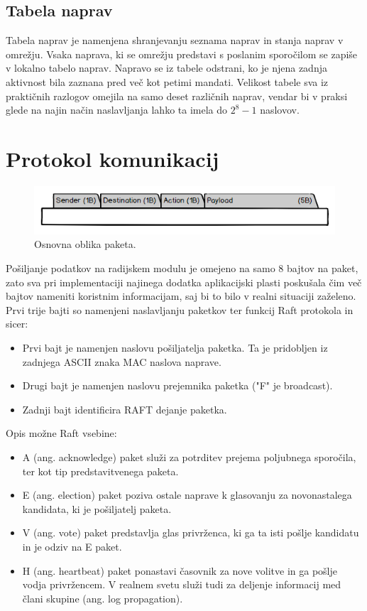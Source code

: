 \documentclass[runningheads]{llncs}
\begin{document}
\subsection{Tabela naprav}
Tabela naprav je namenjena shranjevanju seznama naprav in stanja naprav v omrežju. Vsaka naprava, ki se omrežju predstavi s poslanim sporočilom se zapiše v lokalno tabelo naprav. Napravo se iz tabele odstrani, ko je njena zadnja aktivnost bila zaznana pred več kot petimi mandati. Velikost tabele sva iz praktičnih razlogov omejila na samo deset različnih naprav, vendar bi v praksi glede na najin način naslavljanja lahko ta imela do $2^{8} - 1$ naslovov.

\section{Protokol komunikacij}
\begin{figure}
  \includegraphics[width=\linewidth]{packet.png}
  \caption{Osnovna oblika paketa.}
  \label{fig:paket}
\end{figure}
Pošiljanje podatkov na radijskem modulu je omejeno na samo 8 bajtov na paket, zato sva pri implementaciji najinega dodatka aplikacijski plasti poskušala čim več bajtov nameniti koristnim informacijam, saj bi to bilo v realni situaciji zaželeno. Prvi trije bajti so namenjeni naslavljanju paketkov ter funkcij Raft protokola in sicer: \\
\begin{itemize}
\item Prvi bajt je namenjen naslovu pošiljatelja paketka. Ta je pridobljen iz zadnjega ASCII znaka MAC naslova naprave.
\item Drugi bajt je namenjen naslovu prejemnika paketka ("F" je broadcast).
\item Zadnji bajt identificira RAFT dejanje paketka.
\end{itemize}

Opis možne Raft vsebine: 
\begin{itemize}
\item A (ang. acknowledge) paket služi za potrditev prejema poljubnega sporočila, ter kot tip predstavitvenega paketa.
\item E (ang. election) paket poziva ostale naprave k glasovanju za novonastalega kandidata, ki je pošiljatelj paketa.
\item V (ang. vote) paket predstavlja glas privrženca, ki ga ta isti pošlje kandidatu in je odziv na E paket.
\item H (ang. heartbeat) paket ponastavi časovnik za nove volitve in ga pošlje vodja privržencem. V realnem svetu služi tudi za deljenje informacij med člani skupine (ang. log propagation).
\end{itemize} 
\end{document}

